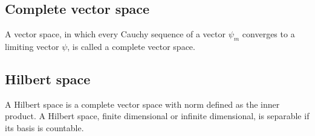 \subsection{Complete vector space}
A vector space, in which every Cauchy sequence of a vector $ \psi_m $ converges to a limiting vector $ \psi $, is called a complete vector space.

\subsection{Hilbert space}
A Hilbert space is a complete vector space with norm defined as the inner product. A Hilbert space, finite dimensional or infinite dimensional, is separable if its basis is countable.